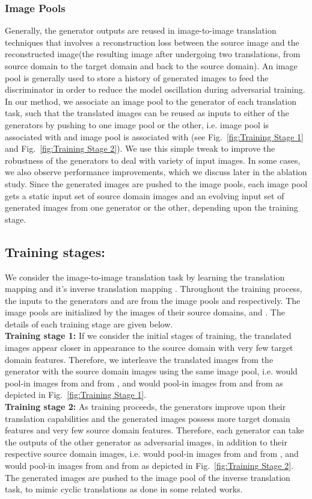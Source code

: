 \documentclass[a4paper,twoside]{article}
\begin{document}
\subsubsection{Image Pools}
\label{Image Pools}
Generally, the generator outputs are reused in image-to-image translation techniques that involves a reconstruction loss between the source image and the reconstructed image(the resulting image after undergoing two translations, from source domain to the target domain and back to the source domain). An image pool \cite{DBLP:journals/corr/ShrivastavaPTSW16} is generally used to store a history of generated images to feed the discriminator in order to reduce the model oscillation during adversarial training. In our method, we associate an image pool to the generator of each translation task, such that the translated images can be reused as inputs to either of the generators by pushing to one image pool or the other, i.e. image pool  is associated with  and image pool  is associated with  (see Fig.~\ref{fig:Training Stage 1} and Fig.~\ref{fig:Training Stage 2}). We use this simple tweak to improve the robustness of the generators to deal with variety of input images. In some cases, we also observe performance improvements, which we discuss later in the ablation study. Since the generated images are pushed to the image pools, each image pool gets a static input set of source domain images and an evolving input set of generated images from one generator or the other, depending upon the training stage.
\subsection{Training stages:}
\label{training stages}
\noindent
We consider the image-to-image translation task  by learning the translation mapping  and it's inverse translation mapping . Throughout the training process, the inputs to the generators  and  are from the image pools  and  respectively. The image pools are initialized by the images of their source domains,  and . The details of each training stage are given below.
\\
\noindent \textbf{Training stage 1:} If we consider the initial stages of training, the translated images appear closer in appearance to the source domain with very few target domain features. Therefore, we interleave the translated images from the generator with the source domain images using the same image pool, i.e.  would pool-in images  from  and  from , and  would pool-in images  from  and  from  as depicted in Fig.~\ref{fig:Training Stage 1}.
\\
\noindent \textbf{Training stage 2:} As training proceeds, the generators improve upon their translation capabilities and the generated images possess more target domain features and very few source domain features. Therefore, each generator can take the outputs of the other generator as adversarial images, in addition to their respective source domain images, i.e.  would pool-in images  from  and  from , and  would pool-in images  from  and  from  as depicted in Fig.~\ref{fig:Training Stage 2}. The generated images are pushed to the image pool of the inverse translation task, to mimic cyclic translations as done in some related works.
\end{document}
